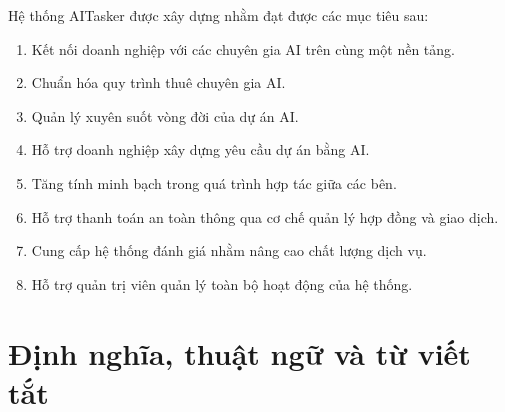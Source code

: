 Hệ thống AITasker được xây dựng nhằm đạt được các mục tiêu sau:

\begin{enumerate}

\item Kết nối doanh nghiệp với các chuyên gia AI trên cùng một nền tảng.

\item Chuẩn hóa quy trình thuê chuyên gia AI.

\item Quản lý xuyên suốt vòng đời của dự án AI.

\item Hỗ trợ doanh nghiệp xây dựng yêu cầu dự án bằng AI.

\item Tăng tính minh bạch trong quá trình hợp tác giữa các bên.

\item Hỗ trợ thanh toán an toàn thông qua cơ chế quản lý hợp đồng và giao dịch.

\item Cung cấp hệ thống đánh giá nhằm nâng cao chất lượng dịch vụ.

\item Hỗ trợ quản trị viên quản lý toàn bộ hoạt động của hệ thống.

\end{enumerate}


\section{Định nghĩa, thuật ngữ và từ viết tắt}

